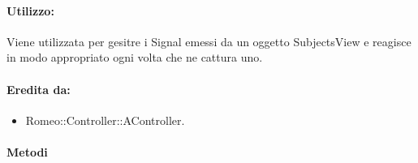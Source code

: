 	\paragraph{Utilizzo:} Viene utilizzata per gesitre i Signal\g{} emessi da un oggetto SubjectsView e reagisce in modo appropriato ogni volta che ne cattura uno.
	\paragraph{Eredita da:}
		\begin{itemize}
			\item Romeo::Controller::AController.
		\end{itemize}
	\paragraph{\color{black}Metodi}
